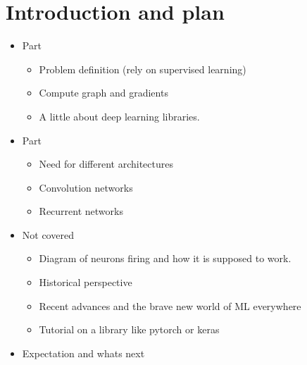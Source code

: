 \section{Introduction and plan}
\begin{frame}{}
	\begin{itemize}
		\item Part 	
			\begin{itemize}
				\item Problem definition (rely on supervised learning)
				\item Compute graph and gradients 
				\item A little about deep learning libraries. 
			\end{itemize}
		\item Part 
			\begin{itemize}
				\item Need for different architectures
				\item Convolution networks 
				\item Recurrent networks  
			\end{itemize}
		\item Not covered 
			\begin{itemize}
				\item Diagram of neurons firing and how it is supposed to work. 
				\item Historical perspective 
				\item Recent advances and the brave new world of ML everywhere
				\item Tutorial on a library like pytorch or keras 
			\end{itemize}
		\item Expectation and whats next
	\end{itemize}
\end{frame}